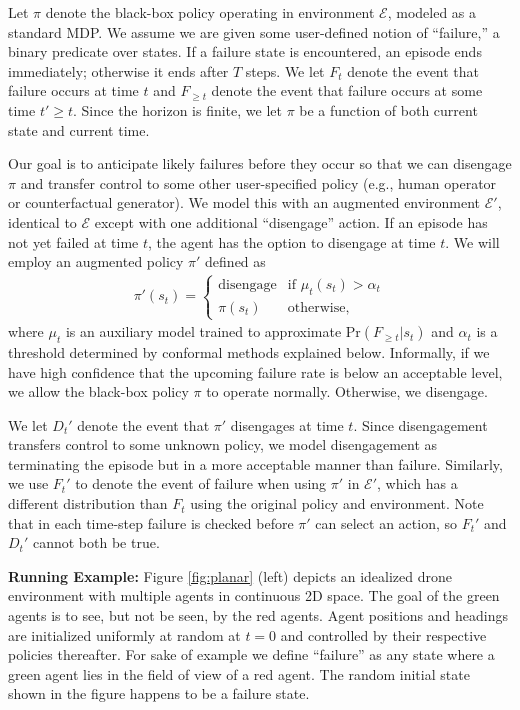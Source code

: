 \documentclass[12pt,letterpaper]{article}
\begin{document}
Let $\pi$ denote the black-box policy operating in environment $\mathcal{E}$, modeled as a standard MDP.  We assume we are given some user-defined notion of ``failure,'' a binary predicate over states.  If a failure state is encountered, an episode ends immediately; otherwise it ends after $T$ steps.  We let $F_t$ denote the event that failure occurs at time $t$ and $F_{\geq t}$ denote the event that failure occurs at some time $t'\geq t$.  Since the horizon is finite, we let $\pi$ be a function of both current state and current time.

Our goal is to anticipate likely failures before they occur so that we can disengage $\pi$ and transfer control to some other user-specified policy (e.g., human operator or counterfactual generator).  We model this with an augmented environment $\mathcal{E}'$, identical to $\mathcal{E}$ except with one additional ``disengage'' action.  If an episode has not yet failed at time $t$, the agent has the option to disengage at time $t$.  We will employ an augmented policy $\pi'$ defined as
\begin{align}
\pi'(s_t) = \begin{cases}
\text{disengage} & \text{if } \mu_t(s_t) > \alpha_t \\
\pi(s_t) & \text{otherwise,}
\end{cases}
\end{align}
where $\mu_t$ is an auxiliary model trained to approximate $\text{Pr}(F_{\geq t}|s_t)$ and $\alpha_t$ is a threshold determined by conformal methods explained below.  Informally, if we have high confidence that the upcoming failure rate is below an acceptable level, we allow the black-box policy $\pi$ to operate normally. Otherwise, we disengage.

We let $D_t'$ denote the event that $\pi'$ disengages at time $t$.  Since disengagement transfers control to some unknown policy, we model disengagement as terminating the episode but in a more acceptable manner than failure.  Similarly, we use $F_t'$ to denote the event of failure when using $\pi'$ in $\mathcal{E}'$, which has a different distribution than $F_t$ using the original policy and environment.  Note that in each time-step failure is checked before $\pi'$ can select an action, so $F_t'$ and $D_t'$ cannot both be true.

\textbf{Running Example:} Figure \ref{fig:planar} (left) depicts an idealized drone environment with multiple agents in continuous 2D space.  The goal of the green agents is to see, but not be seen, by the red agents.  Agent positions and headings are initialized uniformly at random at $t=0$ and controlled by their respective policies thereafter.  For sake of example we define ``failure'' as any state where a green agent lies in the field of view of a red agent.  The random initial state shown in the figure happens to be a failure state.
\end{document}
